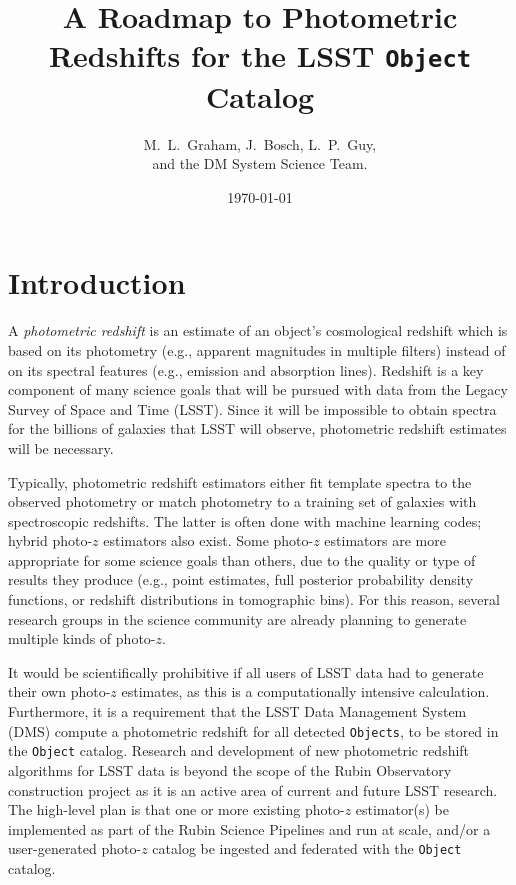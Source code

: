 \documentclass[DM,authoryear,toc]{lsstdoc}
\title[Photo-$z$ for LSST Objects]{A Roadmap to Photometric Redshifts for the LSST {\tt Object} Catalog}
\author{M.~L.~Graham, J.~Bosch, L.~P.~Guy, \\ and the DM System Science Team.}
\date{\today}
\begin{document}
\maketitle



\section{Introduction} \label{sec:intro}

A {\it photometric redshift} is an estimate of an object's cosmological redshift which is based on its photometry (e.g., apparent magnitudes in multiple filters) instead of on its spectral features (e.g., emission and absorption lines). 
Redshift is a key component of many science goals that will be pursued with data from the Legacy Survey of Space and Time (LSST).
Since it will be impossible to obtain spectra for the billions of galaxies that LSST will observe, photometric redshift estimates will be necessary.

Typically, photometric redshift estimators either fit template spectra to the observed photometry or match photometry to a training set of galaxies with spectroscopic redshifts. 
The latter is often done with machine learning codes;  hybrid photo-$z$ estimators also exist. 
Some photo-$z$ estimators are more appropriate for some science goals than others, due to the quality or type of results they produce (e.g., point estimates, full posterior probability density functions, or redshift distributions in tomographic bins).
For this reason, several research groups in the science community are already planning to generate multiple kinds of photo-$z$.

It would be scientifically prohibitive if all users of LSST data had to generate their own photo-$z$ estimates, as this is a computationally intensive calculation.
Furthermore, it is a requirement that the LSST Data Management System (DMS) compute a photometric redshift for all detected {\tt Objects}, to be stored in the {\tt Object} catalog. 
Research and development of new photometric redshift algorithms for LSST data is beyond the scope of the Rubin Observatory construction project as it is an active area of current and future LSST research.
The high-level plan is that one or more existing photo-$z$ estimator(s) be implemented as part of the Rubin Science Pipelines and run at scale, and/or a user-generated photo-$z$ catalog be ingested and federated with the {\tt Object} catalog.
\end{document}
